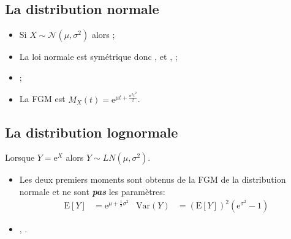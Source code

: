 \documentclass[10pt, french]{article}
\begin{document}
\begin{multicols*}{2}
\subsection{La distribution normale}
\begin{itemize}[leftmargin = *]
	\item	Si $X \sim \mathcal{N}(\mu, \sigma^{2})$ alors ;
	\item	La loi normale est symétrique donc ,  et , ;
	\item	{};
	\item	La FGM est $M_{X}(t)	=	\textrm{e}^{\mu t + \frac{\sigma^{2} t^{2}}{2}}$.
\end{itemize}


\subsection{La distribution lognormale}
Lorsque $Y = \textrm{e}^{X}$ alors $Y \sim LN(\mu,\sigma^{2})$.

\begin{itemize}
	\item	Les deux premiers moments sont obtenus de la FGM de la distribution normale et ne sont \textbf{\textit{pas}} les paramètres:
		\begin{align*}
		\text{E}[Y]
		&=	\textrm{e}^{\mu + \frac{1}{2}\sigma^{2}}	&
		\text{Var}(Y)
		&=	\left(\text{E}[Y]\right)^{2} \left(\textrm{e}^{\sigma^{2}} - 1\right)	
		\end{align*}
	\item	{}, .
\end{itemize}


\end{multicols*}
\end{document}

